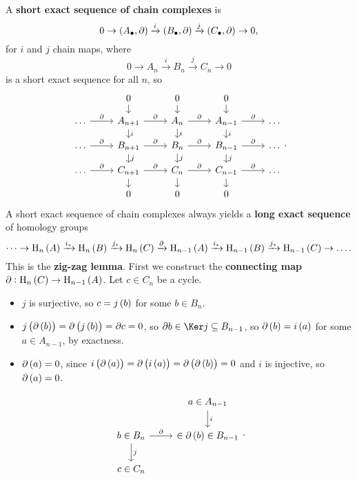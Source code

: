 A \textbf{short exact sequence of chain complexes} is
$$ 0 \to \br{A_\bullet, \partial} \xrightarrow{i} \br{B_\bullet, \partial} \xrightarrow{j} \br{C_\bullet, \partial} \to 0, $$
for $ i $ and $ j $ chain maps, where
$$ 0 \to A_n \xrightarrow{i} B_n \xrightarrow{j} C_n \to 0 $$
is a short exact sequence for all $ n $, so
$$
\begin{tikzcd}[row sep=small]
& 0 \arrow{d} & 0 \arrow{d} & 0 \arrow{d} & \\
\dots \arrow{r}{\partial} & A_{n + 1} \arrow{r}{\partial} \arrow{d}{i} & A_n \arrow{r}{\partial} \arrow{d}{i} & A_{n - 1} \arrow{r}{\partial} \arrow{d}{i} & \dots \\
\dots \arrow{r}{\partial} & B_{n + 1} \arrow{r}{\partial} \arrow{d}{j} & B_n \arrow{r}{\partial} \arrow{d}{j} & B_{n - 1} \arrow{r}{\partial} \arrow{d}{j} & \dots \\
\dots \arrow{r}{\partial} & C_{n + 1} \arrow{r}{\partial} \arrow{d} & C_n \arrow{r}{\partial} \arrow{d} & C_{n - 1} \arrow{r}{\partial} \arrow{d} & \dots \\
& 0 & 0 & 0 &
\end{tikzcd}.
$$
A short exact sequence of chain complexes always yields a \textbf{long exact sequence} of homology groups
$$ \dots \to \H_n\br{A} \xrightarrow{i_*} \H_n\br{B} \xrightarrow{j_*} \H_n\br{C} \xrightarrow{\partial} \H_{n - 1}\br{A} \xrightarrow{i_*} \H_{n - 1}\br{B} \xrightarrow{j_*} \H_{n - 1}\br{C} \to \dots. $$
This is the \textbf{zig-zag lemma}. First we construct the \textbf{connecting map} $ \partial : \H_n\br{C} \to \H_{n - 1}\br{A} $. Let $ c \in C_n $ be a cycle.
\begin{itemize}
\item $ j $ is surjective, so $ c = j\br{b} $ for some $ b \in B_n $.
\item $ j\br{\partial\br{b}} = \partial\br{j\br{b}} = \partial c = 0 $, so $ \partial b \in \Ker j \subseteq B_{n - 1} $, so $ \partial\br{b} = i\br{a} $ for some $ a \in A_{n - 1} $, by exactness.
\item $ \partial\br{a} = 0 $, since $ i\br{\partial\br{a}} = \partial\br{i\br{a}} = \partial\br{\partial\br{b}} = 0 $ and $ i $ is injective, so $ \partial\br{a} = 0 $.
\end{itemize}
$$
\begin{tikzcd}
& a \in A_{n - 1} \arrow{d}{i} \\
b \in B_n \arrow{r}{\partial} \arrow{d}{j} & \in \partial\br{b} \in B_{n - 1} \\
c \in C_n &
\end{tikzcd}.
$$
